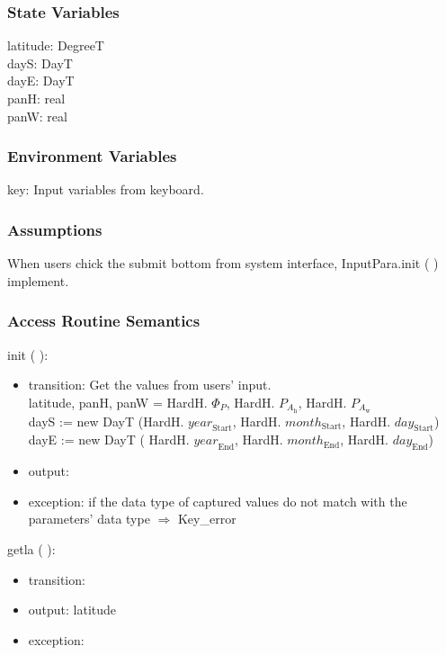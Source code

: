 \documentclass[12pt, titlepage]{article}
\begin{document}
\subsubsection{State Variables}
latitude: DegreeT\\
dayS: DayT \\
dayE: DayT\\
panH: real\\
panW: real


\subsubsection{Environment Variables}
key: Input variables from keyboard.

\subsubsection{Assumptions}
When users chick the submit bottom from system interface, InputPara.init ( ) implement.

\subsubsection{ Access Routine Semantics}

\noindent  init ( ):
\begin{itemize}
\item transition: Get the values from users' input.\\
latitude, panH, panW = HardH. $\Phi_P$, HardH. $P_{A_{\text{h}}}$, HardH. $P_{A_{\text{w}}}$\\

dayS := new DayT (HardH. $\mathit{year}_\text{Start}$, HardH. $\mathit{month}_\text{Start}$, HardH. $\mathit{day}_\text{Start}$) \\

dayE :=  new DayT ( HardH. $\mathit{year}_\text{End}$, HardH. $\mathit{month}_\text{End}$, HardH. $\mathit{day}_\text{End}$)\\
\item output:
\item exception: if the data type of captured values do not match with the parameters' data type $\Rightarrow$ Key\_error
\end{itemize}

\noindent  getla ( ):
\begin{itemize}
\item transition: 
\item output: latitude
\item exception: 
\end{itemize}
\end{document}
